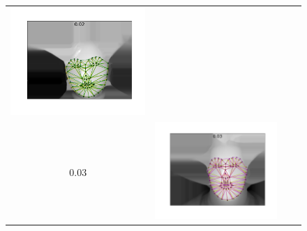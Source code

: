 \begin{figure}
{\begin{tabular}{cccc}
    \includegraphics[valign=m,scale=0.16]{statistical_normals/images/lk2d/aam_error_examples/spherical_002_296}  \\
    0.03                                                                                                         &
    \includegraphics[valign=m,scale=0.16]{statistical_normals/images/lk2d/aam_error_examples/depth_003_398}      &

\end{tabular}}
\end{figure}
